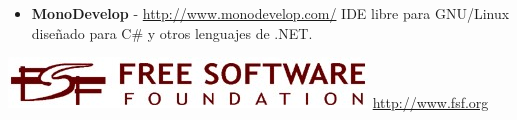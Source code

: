 \begin{flushleft}
\begin{itemize}
\item \textbf{MonoDevelop} - \href{http://www.monodevelop.com/}
  {http://www.monodevelop.com/}
\linebreak IDE libre para GNU/Linux diseñado para C\# y otros lenguajes
de .NET.

\end{itemize}
\end{flushleft}

\begin{center}
  \includegraphics[scale=0.50]{hechoconsl/logofsf.jpg}
  \linebreak\href{http://www.fsf.org}{http://www.fsf.org}
\end{center}

